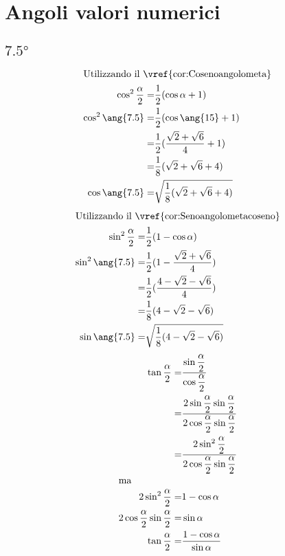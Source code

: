 \chapter{Angoli valori numerici}\label{chap:Angoli_valori_numerici}
\section{$\ang{7.5}$}
\begin{align*}
	\intertext{Utilizzando il~\vref{cor:Cosenoangolometa}}
	\cos^2\dfrac{\alpha}{2}=&\dfrac{1}{2}(\cos\alpha+1)\\
	\cos^2\ang{7.5}=&\dfrac{1}{2}(\cos\ang{15}+1)\\ 
	=&\dfrac{1}{2}(\dfrac{\sqrt{2}+\sqrt{6}}{4}+1)\\
	=&\dfrac{1}{8}(\sqrt{2}+\sqrt{6}+4)\\
	\cos\ang{7.5}=&\sqrt{\dfrac{1}{8}(\sqrt{2}+\sqrt{6}+4)}\\
\end{align*}
\begin{align*}
\intertext{Utilizzando il~\vref{cor:Senoangolometacoseno}}
\sin^2\dfrac{\alpha}{2}=&\dfrac{1}{2}(1-\cos\alpha)\\ 
\sin^2\ang{7.5}=&\dfrac{1}{2}(1-\dfrac{\sqrt{2}+\sqrt{6}}{4})\\ 
=&\dfrac{1}{2}(\dfrac{4-\sqrt{2}-\sqrt{6}}{4})\\ 
=&\dfrac{1}{8}(4-\sqrt{2}-\sqrt{6})\\ 
\sin\ang{7.5}=&\sqrt{\dfrac{1}{8}(4-\sqrt{2}-\sqrt{6})}
\end{align*}
\begin{align*}
	\tan\dfrac{\alpha}{2}=&\dfrac{\sin\dfrac{\alpha}{2}}{\cos\dfrac{\alpha}{2}}\\
	=&\dfrac{2\sin\dfrac{\alpha}{2}\sin\dfrac{\alpha}{2}}{2\cos\dfrac{\alpha}{2}\sin\dfrac{\alpha}{2}}\\
	=&\dfrac{2\sin^2\dfrac{\alpha}{2}}{2\cos\dfrac{\alpha}{2}\sin\dfrac{\alpha}{2}}\\
	\intertext{ma}
	2\sin^2\dfrac{\alpha}{2}=&1-\cos\alpha\\
	2\cos\dfrac{\alpha}{2}\sin\dfrac{\alpha}{2}=&\sin\alpha\\
	\tan\dfrac{\alpha}{2}=&\dfrac{1-\cos\alpha}{\sin\alpha}\\
\end{align*}
